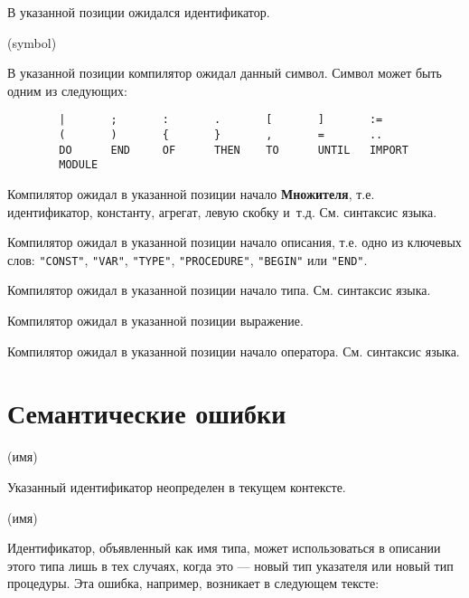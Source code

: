 
В указанной позиции ожидался идентификатор.

(symbol)

В указанной позиции компилятор ожидал данный символ. Символ может быть
одним из следующих:

\begin{verbatim}
        |       ;       :       .       [       ]       :=
        (       )       {       }       ,       =       ..
        DO      END     OF      THEN    TO      UNTIL   IMPORT
        MODULE
\end{verbatim}


Компилятор ожидал в указанной позиции начало {\bf Множителя},
т.е. идентификатор, константу, агрегат, левую скобку и~т.д.
См. синтаксис языка.


Компилятор ожидал в указанной позиции начало описания, т.е. 
одно из ключевых слов:
\verb'"CONST"', \verb'"VAR"', \verb'"TYPE"',
\verb'"PROCEDURE"', \verb'"BEGIN"' или \verb'"END"'.


Компилятор ожидал в указанной позиции начало типа.
См. синтаксис языка.


Компилятор ожидал в указанной позиции выражение.


Компилятор ожидал в указанной позиции начало оператора.
См. синтаксис языка.

\section{Семантические ошибки}

(имя)

Указанный идентификатор неопределен в текущем контексте.

(имя)

Идентификатор, объявленный как имя типа, может использоваться
в описании этого типа лишь в тех случаях, когда это --- новый тип
указателя или новый тип процедуры. Эта ошибка, например, возникает
в следующем тексте:

